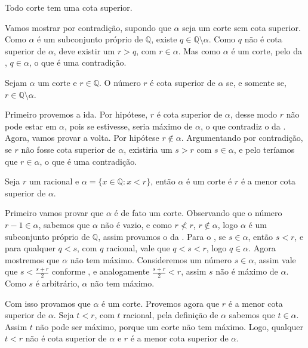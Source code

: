 \documentclass[../main.tex]{subfiles}
\begin{document}
\begin{teo}
    Todo corte tem uma cota superior.
\end{teo}
\begin{dem}
    Vamos mostrar por contradição, supondo que $\alpha$ seja um corte sem cota superior.
    Como $\alpha$ é um subconjunto próprio de $\mathbb{Q}$, existe $q \in \mathbb{Q} \setminus \alpha$. Como $q$ não é cota superior de $\alpha$, deve existir um $r > q$, com $r \in \alpha$. Mas como $\alpha$ é um corte, pelo  da , $q \in \alpha$, o que é uma contradição.
\end{dem}

\begin{prop}
    Sejam $\alpha$ um corte e $r \in \mathbb{Q}$. O número $r$ é cota superior de $\alpha$ se, e somente se, $r \in \mathbb{Q} \setminus \alpha$. 
\end{prop}
\begin{dem}
    Primeiro provemos a ida. Por hipótese, $r$ é cota superior de $\alpha$, desse modo $r$ não pode estar em $\alpha$, pois se estivesse, seria máximo de $\alpha$, o que contradiz o  da .
    Agora, vamos provar a volta. Por hipótese $r \not\in \alpha$. Argumentando por contradição, se $r$ não fosse cota superior de $\alpha$, existiria um $s > r$ com $s \in \alpha$, e pelo  teríamos que $r \in \alpha$, o que é uma contradição.
\end{dem}
\begin{teo}\label{reais-teo-corteRacional}
    Seja $r$ um racional e $\alpha = \{ x \in \mathbb{Q} : x < r \}$, então $\alpha$ é um corte é $r$ é a menor cota superior de $\alpha$.
\end{teo}
\begin{dem}
    
    Primeiro vamos provar que $\alpha$ é de fato um corte. Observando que o número $r - 1 \in \alpha$, sabemos que $\alpha$ não é vazio, e como $r \not< r$, $r \not\in \alpha$, logo $\alpha$ é um subconjunto próprio de $\mathbb{Q}$, assim provamos o  da .
    Para o , se $s \in \alpha$, então $s < r$, e para qualquer $q < s$, com $q$ racional, vale que $q < s < r$, logo $q \in \alpha$.
    Agora mostremos que $\alpha$ não tem máximo. Consideremos um número $s \in \alpha$, assim vale que $s < \frac{s+r}{2}$ conforme , e analogamente $\frac{s+r}{2} < r$, assim $s$ não é máximo de $\alpha$. Como $s$ é arbitrário, $\alpha$ não tem máximo.

    Com isso provamos que $\alpha$ é um corte. Provemos agora que $r$ é a menor cota superior de $\alpha$. Seja $t < r$, com $t$ racional, pela definição de $\alpha$ sabemos que $t \in \alpha$. Assim $t$ não pode ser máximo, porque um corte não tem máximo. Logo, qualquer $t < r$ não é cota superior de $\alpha$ e $r$ é a menor cota superior de $\alpha$.
\end{dem}
\end{document}
